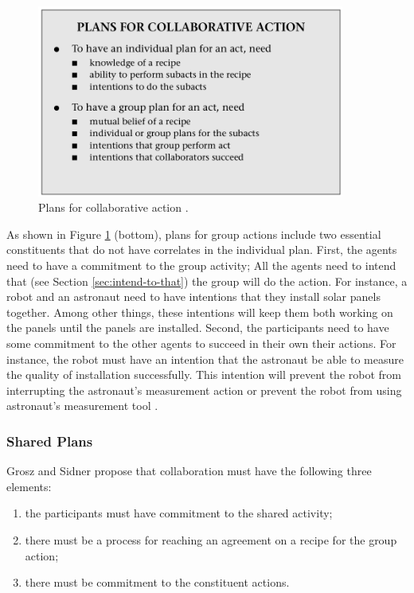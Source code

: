 \documentclass[11pt]{article}
\begin{document}
\begin{figure}[tbh]
  \center
  \includegraphics[width=0.9\textwidth]{figure/plans.png}
  \caption{Plans for collaborative action \cite{grosz:collaborative-systems}.}
  \label{fig:plans}
\end{figure}

As shown in Figure \ref{fig:plans} (bottom), plans for group actions include two
essential constituents that do not have correlates in the individual plan.
First, the agents need to have a commitment to the group activity; All the
agents need to intend that (see Section \ref{sec:intend-to-that}) the group will
do the action. For instance, a robot and an astronaut need to have intentions
that they install solar panels together. Among other things, these intentions
will keep them both working on the panels until the panels are installed.
Second, the participants need to have some commitment to the other agents to
succeed in their own their actions. For instance, the robot must have an
intention that the astronaut be able to measure the quality of installation
successfully. This intention will prevent the robot from interrupting the
astronaut's measurement action or prevent the robot from using astronaut's
measurement tool \cite{grosz:collaborative-systems, grosz:plans-discourse}.

\subsubsection{Shared Plans}
\label{sec:shared}

Grosz and Sidner propose that collaboration must have the following three
elements:

\begin{enumerate}
  \item the participants must have commitment to the shared activity;
  \item there must be a process for reaching an agreement on a recipe for the
  group action;
  \item there must be commitment to the constituent actions. 
\end{enumerate}
\end{document}
